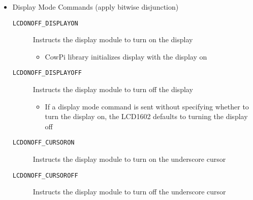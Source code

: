 \begin{itemize}
{\begin{description}
\begin{itemize}
                        \item Display Mode Commands {\tiny (apply bitwise disjunction)}
                            \begin{description}
                                \item[\texttt{LCDONOFF\_DISPLAYON}] Instructs the display module to turn on the display
                                    \begin{itemize}
                                        \item CowPi library initializes display with the display on
                                    \end{itemize}
                                \item[\texttt{LCDONOFF\_DISPLAYOFF}] Instructs the display module to turn off the display
                                \begin{itemize}
                                    \item If a display mode command is sent without specifying whether to turn the display on, the LCD1602 defaults to turning the display off
                                \end{itemize}
                                \item[\texttt{LCDONOFF\_CURSORON}] Instructs the display module to turn on the underscore cursor
                                \item[\texttt{LCDONOFF\_CURSOROFF}] Instructs the display module to turn off the underscore cursor

\end{description}
\end{itemize}
\end{description}}
\end{itemize}
